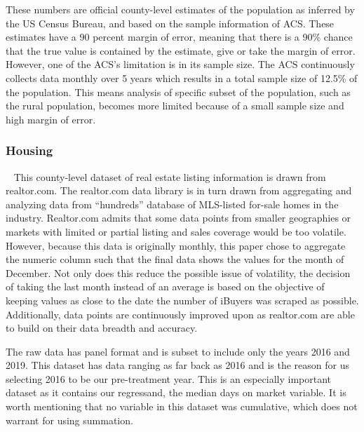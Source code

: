 These numbers are official county-level estimates of the population as inferred by the US Census Bureau, and based on the sample information of ACS. These estimates have a 90 percent margin of error, meaning that there is a 90\% chance that the true value is contained by the estimate, give or take the margin of error. However, one of the ACS’s limitation is in its sample size. The ACS continuously collects data monthly over 5 years which results in a total sample size of 12.5\% of the population. This means analysis of specific subset of the population, such as the rural population, becomes more limited because of a small sample size and high margin of error.  

\subsubsection{Housing}\label{subsubsec_housing} 
This county-level dataset of real estate listing information is drawn from realtor.com. The realtor.com data library is in turn drawn from aggregating and analyzing data from “hundreds” database of MLS-listed for-sale homes in the industry. Realtor.com admits that some data points from smaller geographies or markets with limited or partial listing and sales coverage would be too volatile. However, because this data is originally monthly, this paper chose to aggregate the numeric column such that the final data shows the values for the month of December. Not only does this reduce the possible issue of volatility, the decision of taking the last month instead of an average is based on the objective of keeping values as close to the date the number of iBuyers was scraped as possible. Additionally, data points are continuously improved upon as realtor.com are able to build on their data breadth and accuracy.   

The raw data has panel format and is subset to include only the years 2016 and 2019. This dataset has data ranging as far back as 2016 and is the reason for us selecting 2016 to be our pre-treatment year. This is an especially important dataset as it contains our regressand, the median days on market variable. It is worth mentioning that no variable in this dataset was cumulative, which does not warrant for using summation. 

